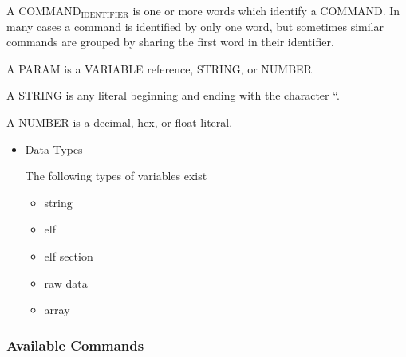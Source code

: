 \documentclass[11pt]{article}
\begin{document}
    A COMMAND$_{\mathrm{IDENTIFIER}}$ is one or more words which identify a
    COMMAND. In many cases a command is identified by only one word,
    but sometimes similar commands are grouped by sharing the first
    word in their identifier.

    A PARAM is a VARIABLE reference, STRING, or NUMBER

    A STRING is any literal beginning and ending with the character ``.

    A NUMBER is a decimal, hex, or float literal.

\begin{itemize}

\item Data Types\\
\label{sec-2.1.1.1}

     The following types of variables exist
\begin{itemize}
\item string
\item elf
\item elf section
\item raw data
\item array
\end{itemize}
\end{itemize} %
\subsubsection{Available Commands}
\label{sec-2.1.2}
\end{document}
